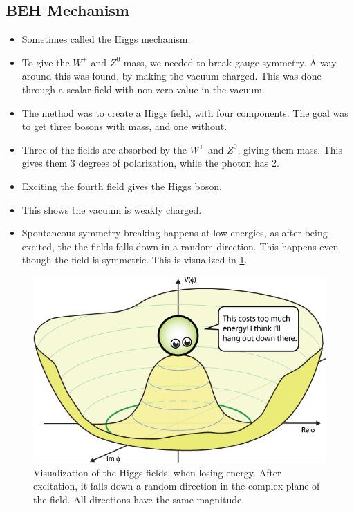\subsection{BEH Mechanism}

\begin{itemize}
  \item Sometimes called the Higgs mechanism.
  \item To give the $W^{±}$ and $Z^{0}$ mass, we needed to break gauge symmetry. A way around this was found, by making the vacuum charged. This was done through a scalar field with non-zero value in the vacuum.
    \item The method was to create a Higgs field, with four components. The goal was to get three bosons with mass, and one without. 
    \item Three of the fields are absorbed by the $W^{±}$ and $Z^{0}$, giving them mass. This gives them 3 degrees of polarization, while the photon has 2.
    \item Exciting the fourth field gives the Higgs boson.
    \item This shows the vacuum is weakly charged. 
    \item Spontaneous symmetry breaking happens at low energies, as after being excited, the the fields falls down in a random direction. This happens even though the field is symmetric. This is visualized in \cref{fig: higgs_field}.    
\end{itemize}
\begin{figure}[ht!]
    \centering
    \includegraphics[width = .45\textwidth]{higgs_field.png}
    \caption{Visualization of the Higgs fields, when losing energy. After excitation, it falls down a random direction in the complex plane of the field. All directions have the same magnitude.}
    \label{fig: higgs_field}
\end{figure}

